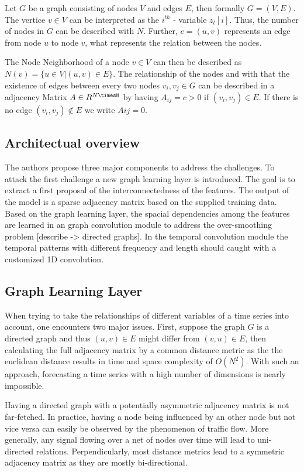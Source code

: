 \documentclass[letterpaper,twocolumn,12pt]{article}
\begin{document}
    Let $G$ be a graph consisting of nodes $V$ and edges $E$, then formally $G=(V,E)$. The vertice $v \in V$ can be
    interpreted as the $i^{th}$ - variable $z_t[i]$. Thus, the number of nodes in $G$ can be described with $N$.
    Further, $e = (u,v)$ represents an edge from node $u$ to node $v$, what represents the relation between the nodes.

    The Node Neighborhood of a node $v \in V$ can then be described as $N(v) = \{u \in V| (u,v) \in E\}$.
    The relationship of the nodes and with that the existence of edges between every two nodes $v_i,v_j \in G$
    can be described in a adjacency Matrix $A \in R^{N\timesN}$ by
    having  $A_{ij} = c > 0$ if $(v_i,v_j) \in E$. If there is no edge $(v_i,v_j) \notin E$ we write $Aij = 0$.

    \subsection{Architectual overview}
    The authors propose three major components to address the challenges. To attack the first challenge a new graph learning layer
    is introduced. The goal is to extract a first proposal of the interconnectedness of the features. The output of the model is a sparse adjacency matrix based on the supplied training data.
    Based on the graph learning layer, the spacial dependencies among the features are learned in an graph convolution module to address the over-smoothing problem [describe -> directed graphs].
    In the temporal convolution module the temporal patterns with different frequency and length should caught with a customized 1D convolution.

    \subsection{Graph Learning Layer}
    When trying to take the relationships of different variables of a time series into account, one encounters two major issues.
    First, suppose the graph $G$ is a directed graph and thus $(u,v)\in E$ might differ from $(v,u)\in E$,
    then calculating the full adjacency matrix by a common distance metric as the the euclidean distance results in time and space complexity of $O(N^2)$.
    With such an approach, forecasting a time series with a high number of dimensions is nearly impossible.

    Having a directed graph with a potentially asymmetric adjacency matrix is not far-fetched.
    In practice, having a node being influenced by an other node but not vice versa can easily be observed by the phenomenon of traffic flow.
    More generally, any signal flowing over a net of nodes over time will lead to uni-directed relations.
    Perpendicularly, most distance metrics lead to a symmetric adjacency matrix as they are mostly bi-directional.
\end{document}
